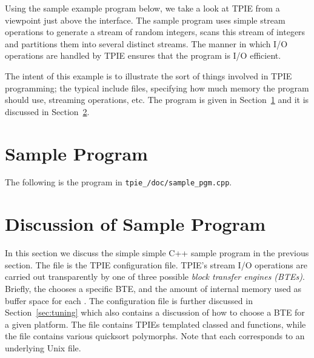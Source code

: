 Using the sample example program below, we take a look at TPIE from a
viewpoint just above the  interface.  The
sample program uses simple stream operations to generate a stream of random
integers, scans this stream of integers and partitions them into several
distinct streams. The manner in which I/O operations are handled by TPIE
ensures that the program is I/O efficient.


The intent of this example is to illustrate the sort of
things involved in TPIE programming; the typical include
files, specifying how much memory the program should use,
streaming operations, etc. The program is given in
Section~\ref{sec:samplepgm} and it is discussed in
Section~\ref{sec:samplepgm_discuss}.


\section{Sample Program}\label{sec:samplepgm}

The following is the program in {\tt  tpie\_\version/doc/sample\_pgm.cpp}.



\section{Discussion of Sample Program}\label{sec:samplepgm_discuss}

In this section we discuss the simple simple C++ sample
program in the previous section. The file
 is the TPIE configuration file. TPIE's
 stream I/O operations are carried out
transparently by one of three possible \emph{block transfer
   engines (BTEs)}. Briefly, the  chooses
a specific BTE, and the amount of internal memory used as
buffer space for each . The
 configuration file is further discussed
in Section~\ref{sec:tuning} which also contains a discussion
of how to choose a BTE for a given platform. The file
 contains TPIEs templated classed and
functions, while the file  contains
various quicksort polymorphs. Note that each
 corresponds to an underlying Unix file.

